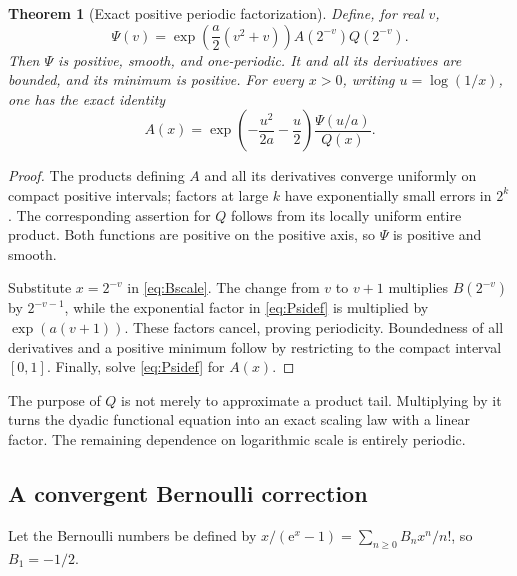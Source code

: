 \documentclass[11pt,oneside]{article}
\numberwithin{equation}{section}
\newtheorem{theorem}{Theorem}[section]
\theoremstyle{definition}
\theoremstyle{remark}
\newcommand{\e}{\mathrm e}
\begin{document}
\begin{theorem}[Exact positive periodic factorization]
\label{thm:periodic}
Define, for real \(v\),
\begin{equation}
 \Psi(v)=\exp\!\left(\frac a2(v^2+v)\right)
              A(2^{-v})Q(2^{-v}).
 \label{eq:Psidef}
\end{equation}
Then \(\Psi\) is positive, smooth, and one-periodic. It and all its derivatives
are bounded, and its minimum is positive. For every \(x>0\), writing
\(u=\log(1/x)\), one has the exact identity
\begin{equation}
 A(x)=\exp\!\left(-\frac{u^2}{2a}-\frac u2\right)
                \frac{\Psi(u/a)}{Q(x)}.
 \label{eq:Afactor}
\end{equation}
\end{theorem}
\begin{proof}
The products defining \(A\) and all its derivatives converge uniformly on
compact positive intervals; factors at large \(k\) have exponentially small
errors in \(2^k\). The corresponding assertion for \(Q\) follows from its
locally uniform entire product. Both functions are positive on the positive
axis, so \(\Psi\) is positive and smooth.

Substitute \(x=2^{-v}\) in \eqref{eq:Bscale}. The change from \(v\) to
\(v+1\) multiplies \(B(2^{-v})\) by \(2^{-v-1}\), while the exponential
factor in \eqref{eq:Psidef} is multiplied by \(\exp(a(v+1))\). These factors
cancel, proving periodicity. Boundedness of all derivatives and a positive
minimum follow by restricting to the compact interval \([0,1]\).
Finally, solve \eqref{eq:Psidef} for \(A(x)\).
\end{proof}

The purpose of \(Q\) is not merely to approximate a product tail. Multiplying
by it turns the dyadic functional equation into an exact scaling law with a
linear factor. The remaining dependence on logarithmic scale is entirely
periodic.

\subsection{A convergent Bernoulli correction}
Let the Bernoulli numbers be defined by
\(x/(\e^x-1)=\sum_{n\ge0}B_nx^n/n!\), so \(B_1=-1/2\).
\end{document}
